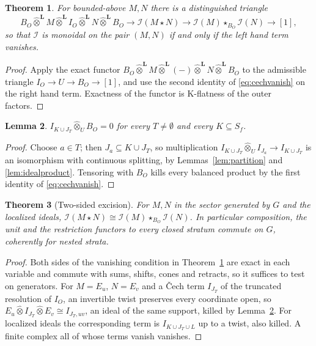 \documentclass[11pt]{amsart}
\newtheorem{theorem}{Theorem}[section]
\newtheorem{lemma}[theorem]{Lemma}
\theoremstyle{definition}
\theoremstyle{remark}
\begin{document}
\begin{theorem}\label{thm:exctriangle}
For bounded-above $M,N$ there is a distinguished triangle
\begin{equation}\label{eq:exctriangle}
B_O\widehat\otimes^{\mathbf L}M\widehat\otimes^{\mathbf L}I_O
\widehat\otimes^{\mathbf L}N\widehat\otimes^{\mathbf L}B_O
\longrightarrow \mathcal I(M\star N)\longrightarrow
\mathcal I(M)\star_{B_O}\mathcal I(N)\longrightarrow[1],
\end{equation}
so that $\mathcal I$ is monoidal on the pair $(M,N)$ if and only if the left
hand term vanishes.
\end{theorem}

\begin{proof}
Apply the exact functor
$B_O\widehat\otimes^{\mathbf L}M\widehat\otimes^{\mathbf L}(-)
\widehat\otimes^{\mathbf L}N\widehat\otimes^{\mathbf L}B_O$ to the admissible
triangle $I_O\to U\to B_O\to[1]$, and use the second identity of
\eqref{eq:cechvanish} on the right hand term.  Exactness of the functor is
K-flatness of the outer factors.
\end{proof}

\begin{lemma}\label{lem:excvanish}
$I_{K\cup J_T}\widehat\otimes_U B_O=0$ for every $T\ne\emptyset$ and every
$K\subseteq S_f$.
\end{lemma}

\begin{proof}
Choose $a\in T$; then $J_a\subseteq K\cup J_T$, so multiplication
$I_{K\cup J_T}\widehat\otimes_U I_{J_a}\to I_{K\cup J_T}$ is an isomorphism
with continuous splitting, by Lemmas~\ref{lem:partition} and
\ref{lem:idealproduct}.
Tensoring with $B_O$ kills every balanced product by the first identity of
\eqref{eq:cechvanish}.
\end{proof}

\begin{theorem}[Two-sided excision]\label{thm:excision}
For $M,N$ in the sector generated by $G$ and the localized ideals,
$\mathcal I(M\star N)\cong\mathcal I(M)\star_{B_O}\mathcal I(N)$.  In
particular composition, the unit and the restriction functors to every closed
stratum commute on $G$, coherently for nested strata.
\end{theorem}

\begin{proof}
Both sides of the vanishing condition in Theorem~\ref{thm:exctriangle} are
exact in each variable and commute with sums, shifts, cones and retracts, so it
suffices to test on generators.  For $M=E_u$, $N=E_v$ and a \v Cech term
$I_{J_T}$ of the truncated resolution of $I_O$, an invertible twist preserves
every coordinate open, so
$E_u\widehat\otimes I_{J_T}\widehat\otimes E_v\cong I_{J_T,uv}$, an ideal of
the same support, killed by Lemma~\ref{lem:excvanish}.  For localized ideals
the corresponding term is $I_{K\cup J_T\cup L}$ up to a twist, also killed.  A
finite complex all of whose terms vanish vanishes.
\end{proof}
\end{document}
